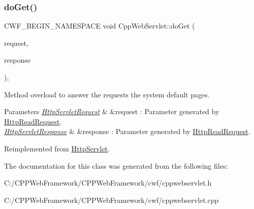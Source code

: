 \subsubsection{\texorpdfstring{do\+Get()}{doGet()}}
{\footnotesize\ttfamily C\+W\+F\+\_\+\+B\+E\+G\+I\+N\+\_\+\+N\+A\+M\+E\+S\+P\+A\+CE void Cpp\+Web\+Servlet\+::do\+Get (\begin{DoxyParamCaption}\item[{\mbox{\hyperlink{class_http_servlet_request}{Http\+Servlet\+Request}} \&}]{request,  }\item[{\mbox{\hyperlink{class_http_servlet_response}{Http\+Servlet\+Response}} \&}]{response }\end{DoxyParamCaption})\hspace{0.3cm}{\ttfamily [override]}, {\ttfamily [virtual]}}



Method overload to answer the requests the system default pages. 


\begin{DoxyParams}{Parameters}
{\em \mbox{\hyperlink{class_http_servlet_request}{Http\+Servlet\+Request}}} & \&request \+: Parameter generated by \mbox{\hyperlink{class_http_read_request}{Http\+Read\+Request}}. \\
\hline
{\em \mbox{\hyperlink{class_http_servlet_response}{Http\+Servlet\+Response}}} & \&response \+: Parameter generated by \mbox{\hyperlink{class_http_read_request}{Http\+Read\+Request}}. \\
\hline
\end{DoxyParams}


Reimplemented from \mbox{\hyperlink{class_http_servlet_a7c851e2989b7a61e5c8470b562690516}{Http\+Servlet}}.



The documentation for this class was generated from the following files\+:\begin{DoxyCompactItemize}
\item 
C\+:/\+C\+P\+P\+Web\+Framework/\+C\+P\+P\+Web\+Framework/cwf/cppwebservlet.\+h\item 
C\+:/\+C\+P\+P\+Web\+Framework/\+C\+P\+P\+Web\+Framework/cwf/cppwebservlet.\+cpp\end{DoxyCompactItemize}

